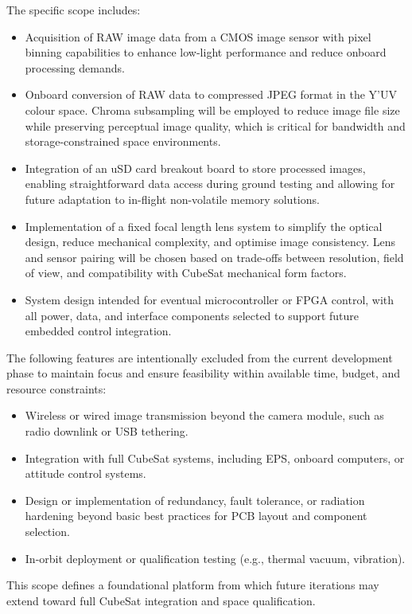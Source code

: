 \documentclass[10pt]{article}
\begin{document}
The specific scope includes:
\begin{itemize}
    \item Acquisition of RAW image data from a CMOS image sensor with pixel binning capabilities to enhance low-light performance and reduce onboard processing demands.
    \item Onboard conversion of RAW data to compressed JPEG format in the Y'UV colour space. Chroma subsampling will be employed to reduce image file size while preserving perceptual image quality, which is critical for bandwidth and storage-constrained space environments.
    \item Integration of an uSD card breakout board to store processed images, enabling straightforward data access during ground testing and allowing for future adaptation to in-flight non-volatile memory solutions.
    \item Implementation of a fixed focal length lens system to simplify the optical design, reduce mechanical complexity, and optimise image consistency. Lens and sensor pairing will be chosen based on trade-offs between resolution, field of view, and compatibility with CubeSat mechanical form factors.
    \item System design intended for eventual microcontroller or FPGA control, with all power, data, and interface components selected to support future embedded control integration.
\end{itemize}

The following features are intentionally excluded from the current development phase to maintain focus and ensure feasibility within available time, budget, and resource constraints:
\begin{itemize}
    \item Wireless or wired image transmission beyond the camera module, such as radio downlink or USB tethering.
    \item Integration with full CubeSat systems, including EPS, onboard computers, or attitude control systems.
    \item Design or implementation of redundancy, fault tolerance, or radiation hardening beyond basic best practices for PCB layout and component selection.
    \item In-orbit deployment or qualification testing (e.g., thermal vacuum, vibration).
\end{itemize}

This scope defines a foundational platform from which future iterations may extend toward full CubeSat integration and space qualification.
\end{document}
